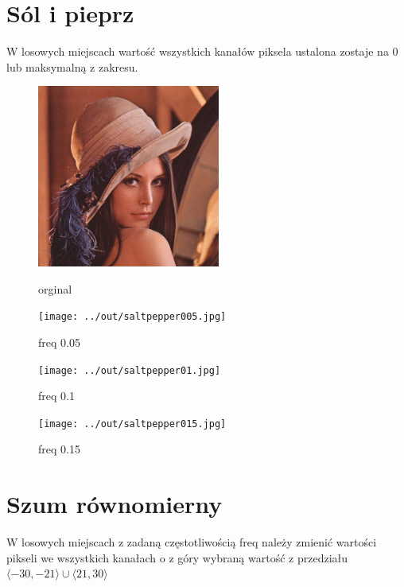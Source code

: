 \documentclass[a4paper,12pt]{article}
\begin{document}
\newpage
\section{Sól i pieprz}
W losowych miejscach wartość wszystkich kanałów piksela ustalona zostaje na 0 lub maksymalną z zakresu.



\begin{figure}[h!]
\begin{minipage}[t]{6cm}
\begin{center}
\includegraphics[width=6cm,clip]{../../lena.jpg}
\caption{orginal}
\end{center}
\end{minipage}
\hfill
\begin{minipage}[t]{6cm}
\begin{center}
\texttt{[image: ../out/saltpepper005.jpg]}
\caption{freq 0.05}
\end{center}
\end{minipage}
\end{figure}

\begin{figure}[h!]
\begin{minipage}[t]{6cm}
\begin{center}
\texttt{[image: ../out/saltpepper01.jpg]}
\caption{freq 0.1}
\end{center}
\end{minipage}
\hfill
\begin{minipage}[t]{6cm}
\begin{center}
\texttt{[image: ../out/saltpepper015.jpg]}
\caption{freq 0.15}
\end{center}
\end{minipage}
\end{figure}


\section{Szum równomierny}
W losowych miejscach z zadaną częstotliwością freq należy zmienić wartości pikseli we wszystkich kanałach o z góry wybraną wartość z przedziału $ \langle -30, -21 \rangle \cup \langle 21, 30 \rangle $
\end{document}
